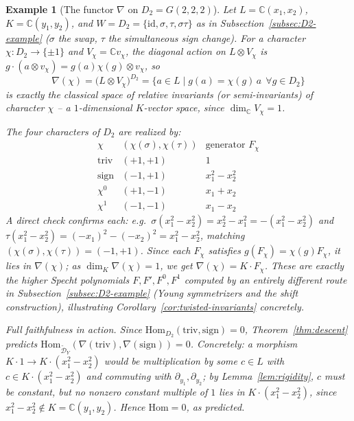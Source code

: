 \documentclass[11pt,a4paper]{article}
\newtheorem{example}[theorem]{Example}
\begin{document}
\begin{example}[The functor $\nabla$ on $D_2 = G(2,2,2)$]\label{ex:nabla-D2}
Let $L = \mathbb{C}(x_1,x_2)$, $K = \mathbb{C}(y_1,y_2)$, and
$W = D_2 = \{\mathrm{id},\sigma,\tau,\sigma\tau\}$ as in
Subsection~\ref{subsec:D2-example} ($\sigma$ the swap, $\tau$ the
simultaneous sign change). For a character
$\chi : D_2 \to \{\pm 1\}$ and $V_\chi = \mathbb{C}v_\chi$, the
diagonal action on $L \otimes V_\chi$ is
$g\cdot(a\otimes v_\chi) = g(a)\chi(g)\otimes v_\chi$, so
\[
  \nabla(\chi) = \big(L\otimes V_\chi\big)^{D_2}
  = \{a \in L \mid g(a) = \chi(g)\,a \ \ \forall g \in D_2\}
\]
is exactly the classical space of \emph{relative invariants} (or
semi-invariants) of character $\chi$ -- a $1$-dimensional $K$-vector
space, since $\dim_{\mathbb{C}} V_\chi = 1$.

The four characters of $D_2$ are realized by:
\[
  \begin{array}{c|c|c}
  \chi & (\chi(\sigma),\chi(\tau)) & \text{generator } F_\chi \\\hline
  \mathrm{triv} & (+1,+1) & 1 \\
  \mathrm{sign} & (-1,+1) & x_1^2 - x_2^2 \\
  \chi^0 & (+1,-1) & x_1+x_2 \\
  \chi^1 & (-1,-1) & x_1-x_2
  \end{array}
\]
A direct check confirms each: e.g.\ $\sigma(x_1^2-x_2^2)=x_2^2-x_1^2=-(x_1^2-x_2^2)$
and $\tau(x_1^2-x_2^2) = (-x_1)^2-(-x_2)^2 = x_1^2-x_2^2$, matching
$(\chi(\sigma),\chi(\tau))=(-1,+1)$. Since each $F_\chi$ satisfies
$g(F_\chi)=\chi(g)F_\chi$, it lies in $\nabla(\chi)$; as
$\dim_K \nabla(\chi)=1$, we get $\nabla(\chi) = K\cdot F_\chi$. These
are exactly the higher Specht polynomials $F,F',F^0,F^1$ computed by
an entirely different route in Subsection~\ref{subsec:D2-example}
(Young symmetrizers and the shift construction), illustrating
Corollary~\ref{cor:twisted-invariants} concretely.

\emph{Full faithfulness in action.} Since $\mathrm{Hom}_{D_2}(\mathrm{triv},\mathrm{sign})=0$,
Theorem~\ref{thm:descent} predicts
$\mathrm{Hom}_{\widetilde{\mathcal{D}}_Y}(\nabla(\mathrm{triv}),\nabla(\mathrm{sign}))=0$.
Concretely: a morphism $K\cdot 1 \to K\cdot(x_1^2-x_2^2)$ would be
multiplication by some $c \in L$ with $c \in K\cdot(x_1^2-x_2^2)$ and
commuting with $\partial_{y_1},\partial_{y_2}$; by
Lemma~\ref{lem:rigidity}, $c$ must be constant, but no nonzero
constant multiple of $1$ lies in $K\cdot(x_1^2-x_2^2)$, since
$x_1^2 - x_2^2 \notin K = \mathbb{C}(y_1,y_2)$. Hence
$\mathrm{Hom} = 0$, as predicted.


\end{example}
\end{document}
